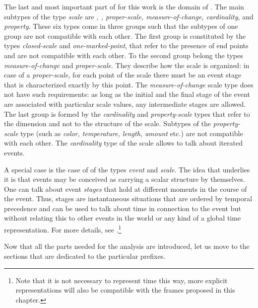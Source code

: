 The last and most important part of  for this work is the domain of . The main subtypes of the type \textit{scale} are \textit{, , proper-scale, measure-of-change, cardinality}, and \textit{property}. These six types come in three groups such that the subtypes of one group are not compatible with each other. The first group is constituted by the types \textit{closed-scale} and \textit{one-marked-point}, that refer to the presence of end points and are not compatible with each other. To the second group belong the types \textit{measure-of-change} and \textit{proper-scale}. They describe how the scale is organized: in case of a \textit{proper-scale,} for each point of the scale there must be an event stage that is characterized exactly by this point. The \textit{measure-of-change} scale type does not have such requirements: as long as the initial and the final stage of the event are associated with particular scale values, any intermediate stages are allowed. The last group is formed by the \textit{cardinality} and \textit{property-scale} types that refer to the dimension and not to the structure of the scale. Subtypes of the \textit{property-scale} type (such as \textit{color, temperature, length, amount} etc.) are not compatible with each other. The \textit{cardinality} type of the scale allows to talk about iterated events.

A special case is the case of  of the types \textit{event} and \textit{scale}. The idea that underlies it is that events may be conceived as carrying a scalar structure by themselves. One can talk about event \emph{stages} that hold at different moments in the course of the event. Thus, stages are instantaneous situations that are ordered by temporal precedence and can be used to talk about time in connection to the event but without relating this to other events in the world or any kind of a global time representation. For more details, see \citet{ZinovaOsswald:paper}.\footnote{Note that it is not necessary to represent time  this way, more explicit representations will also be compatible with the frames proposed in this chapter.}

Now that all the parts needed for the analysis are introduced, let us move to the sections that are dedicated to the particular prefixes.


